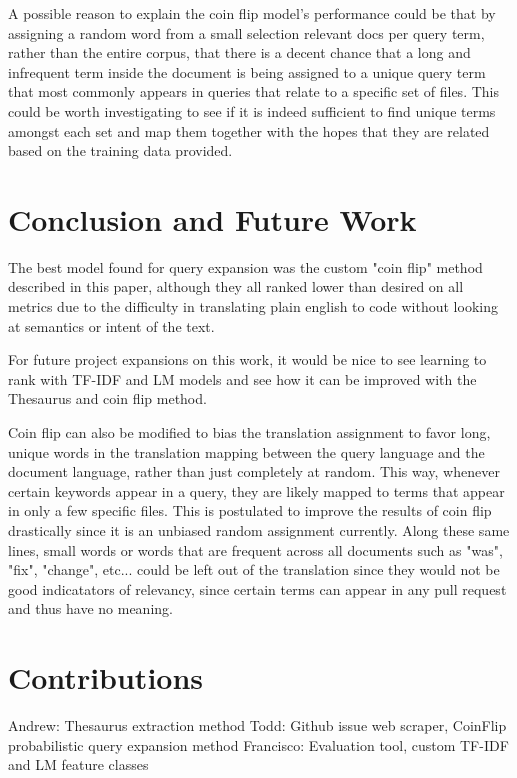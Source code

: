 \documentclass[10pt,a4paper]{article}
\begin{document}
A possible reason to explain the coin flip model’s performance could be that by assigning a random word from a small selection relevant docs per query term, rather than the entire corpus, that there is a decent chance that a long and infrequent term inside the document is being assigned to a unique query term that most commonly appears in queries that relate to a specific set of files. This could be worth investigating to see if it is indeed sufficient to find unique terms amongst each set and map them together with the hopes that they are related based on the training data provided.


\section{Conclusion and Future Work}

The best model found for query expansion was the custom "coin flip" method described in
this paper, although they all ranked lower than desired on all metrics due to the difficulty
in translating plain english to code without looking at semantics or intent of the text.

For future project expansions on this work, it would be nice to see learning to
rank with TF-IDF and LM models and see how it can be improved with the Thesaurus
and coin flip method.

Coin flip can also be modified to bias the translation assignment to favor
long, unique words in the translation mapping between the query language and the
document language, rather than just completely at random. This way, whenever
certain keywords appear in a query, they are likely mapped to terms that appear
in only a few specific files. This is postulated to improve the results of coin
flip drastically since it is an unbiased random assignment currently. Along
these same lines, small words or words that are frequent across all documents
such as "was", "fix", "change", etc... could be left out of the translation
since they would not be good indicatators of relevancy, since certain terms can
appear in any pull request and thus have no meaning.

\section{Contributions}

Andrew: Thesaurus extraction method
Todd: Github issue web scraper, CoinFlip probabilistic query expansion method
Francisco: Evaluation tool, custom TF-IDF and LM feature classes
\end{document}
